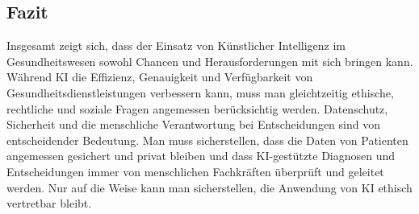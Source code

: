 \documentclass{report}
\begin{document}
\subsection {Fazit}

Insgesamt zeigt sich, dass der Einsatz von Künstlicher Intelligenz im Gesundheitswesen sowohl Chancen
und Herausforderungen mit sich bringen kann. Während KI die Effizienz, Genauigkeit und Verfügbarkeit
von Gesundheitsdienstleistungen verbessern kann, muss man gleichtzeitig ethische, rechtliche und soziale Fragen angemessen berücksichtig werden.
Datenschutz, Sicherheit und die menschliche Verantwortung bei Entscheidungen sind von entscheidender Bedeutung. Man muss sicherstellen,
dass die Daten von Patienten angemessen gesichert und privat bleiben und dass KI-gestützte
Diagnosen und Entscheidungen immer von menschlichen Fachkräften überprüft und geleitet werden. Nur auf die Weise
kann man sicherstellen, die Anwendung von KI ethisch vertretbar bleibt.



\printbibliography
\listoffigures
\end{document}
